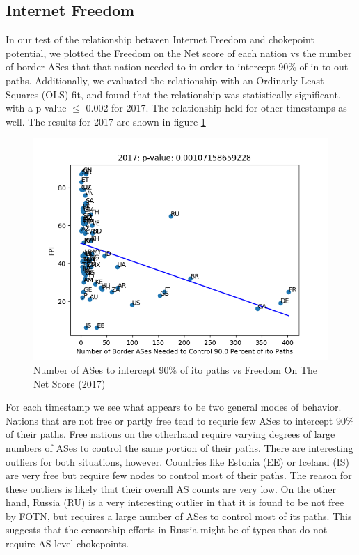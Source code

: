 \documentclass[10pt, conference, letterpaper]{IEEEtran}
\begin{document}
\subsection{Internet Freedom}

In our test of the relationship between Internet Freedom and chokepoint potential, we plotted the Freedom on the Net score
of each nation vs the number of border ASes that that nation needed to in order to intercept 90\% of in-to-out paths. Additionally,
we evaluated the relationship with an Ordinarly Least Squares (OLS) fit, and found that the relationship was statistically significant,
with a p-value $\leq$ 0.002 for 2017. The relationship held for other timestamps as well. The results for 2017 are shown in figure \ref{fig:fotn2017}

\begin{figure}
	\centering
	\includegraphics[width=\linewidth]{fotn2017}
	\caption{Number of ASes to intercept 90\% of ito paths vs Freedom On The Net Score (2017)}\label{fig:fotn2017}
\end{figure}

\par
For each timestamp we see what appears to be two general modes of behavior. Nations that are not free or partly free tend to requrie few ASes
to intercept 90\% of their paths. Free nations on the otherhand require varying degrees of large numbers of ASes to control the same portion
of their paths. There are interesting outliers for both situations, however. Countries like Estonia (EE) or Iceland (IS) are very free but require
few nodes to control most of their paths. The reason for these outliers is likely that their overall AS counts are very low. On the other hand, Russia (RU)
is a very interesting outlier in that it is found to be not free by FOTN, but requires a large number of ASes to control most of its paths. This suggests
that the censorship efforts in Russia might be of types that do not require AS level chokepoints.
\end{document}

